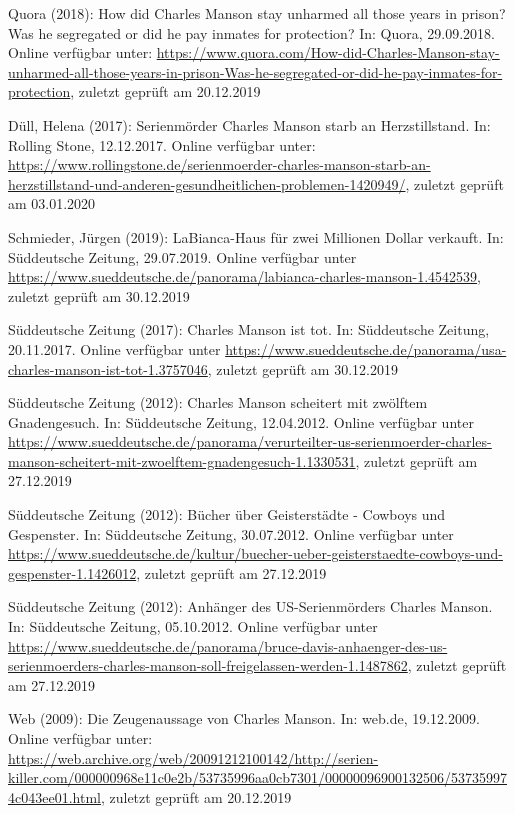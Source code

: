 \documentclass[
]{article}
\begin{document}
Quora (2018): How did Charles Manson stay unharmed all those years in
prison? Was he segregated or did he pay inmates for protection? In:
Quora, 29.09.2018. Online verfügbar unter:
\url{https://www.quora.com/How-did-Charles-Manson-stay-unharmed-all-those-years-in-prison-Was-he-segregated-or-did-he-pay-inmates-for-protection},
zuletzt geprüft am 20.12.2019

Düll, Helena (2017): Serienmörder Charles Manson starb an
Herzstillstand. In: Rolling Stone, 12.12.2017. Online verfügbar unter:
\url{https://www.rollingstone.de/serienmoerder-charles-manson-starb-an-herzstillstand-und-anderen-gesundheitlichen-problemen-1420949/},
zuletzt geprüft am 03.01.2020

Schmieder, Jürgen (2019): LaBianca-Haus für zwei Millionen Dollar
verkauft. In: Süddeutsche Zeitung, 29.07.2019. Online verfügbar unter
\url{https://www.sueddeutsche.de/panorama/labianca-charles-manson-1.4542539},
zuletzt geprüft am 30.12.2019

Süddeutsche Zeitung (2017): Charles Manson ist tot. In: Süddeutsche
Zeitung, 20.11.2017. Online verfügbar unter
\url{https://www.sueddeutsche.de/panorama/usa-charles-manson-ist-tot-1.3757046},
zuletzt geprüft am 30.12.2019

Süddeutsche Zeitung (2012): Charles Manson scheitert mit zwölftem
Gnadengesuch. In: Süddeutsche Zeitung, 12.04.2012. Online verfügbar
unter
\url{https://www.sueddeutsche.de/panorama/verurteilter-us-serienmoerder-charles-manson-scheitert-mit-zwoelftem-gnadengesuch-1.1330531},
zuletzt geprüft am 27.12.2019

Süddeutsche Zeitung (2012): Bücher über Geisterstädte - Cowboys und
Gespenster. In: Süddeutsche Zeitung, 30.07.2012. Online verfügbar unter
\url{https://www.sueddeutsche.de/kultur/buecher-ueber-geisterstaedte-cowboys-und-gespenster-1.1426012},
zuletzt geprüft am 27.12.2019

Süddeutsche Zeitung (2012): Anhänger des US-Serienmörders Charles
Manson. In: Süddeutsche Zeitung, 05.10.2012. Online verfügbar unter
\url{https://www.sueddeutsche.de/panorama/bruce-davis-anhaenger-des-us-serienmoerders-charles-manson-soll-freigelassen-werden-1.1487862},
zuletzt geprüft am 27.12.2019

Web (2009): Die Zeugenaussage von Charles Manson. In: web.de,
19.12.2009. Online verfügbar unter:
\url{https://web.archive.org/web/20091212100142/http://serien-killer.com/000000968e11c0e2b/53735996aa0cb7301/00000096900132506/537359974c043ee01.html},
zuletzt geprüft am 20.12.2019
\end{document}
